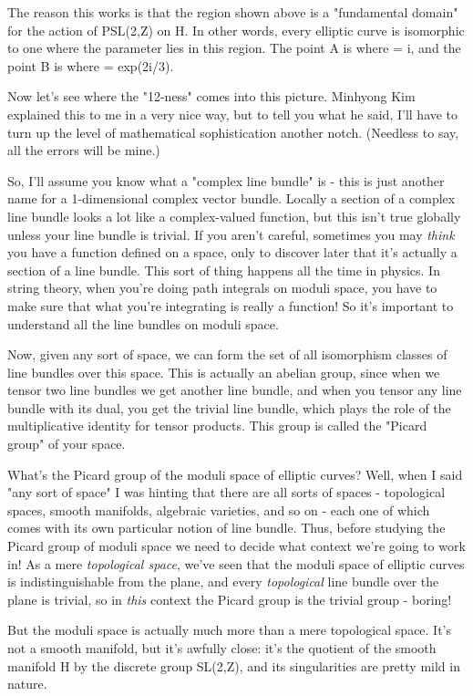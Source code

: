 The reason this works is that the region shown above is a "fundamental
domain" for the action of PSL(2,Z) on H.  In other words, every
elliptic curve is isomorphic to one where the parameter \tau  lies in
this region.  The point A is where \tau  = i, and the point B is where
\tau  = exp(2\pi i/3).

Now let's see where the "12-ness" comes into this picture.  Minhyong
Kim explained this to me in a very nice way, but to tell you what he
said, I'll have to turn up the level of mathematical sophistication
another notch.  (Needless to say, all the errors will be mine.)

So, I'll assume you know what a "complex line bundle" is - this is
just another name for a 1-dimensional complex vector bundle.  Locally
a section of a complex line bundle looks a lot like a complex-valued
function, but this isn't true globally unless your line bundle is
trivial.  If you aren't careful, sometimes you may \emph{think} you have a
function defined on a space, only to discover later that it's actually
a section of a line bundle.  This sort of thing happens all the time
in physics.  In string theory, when you're doing path integrals on
moduli space, you have to make sure that what you're integrating is
really a function!  So it's important to understand all the line bundles
on moduli space.

Now, given any sort of space, we can form the set of all isomorphism
classes of line bundles over this space.  This is actually an abelian
group, since when we tensor two line bundles we get another line
bundle, and when you tensor any line bundle with its dual, you get the
trivial line bundle, which plays the role of the multiplicative
identity for tensor products.  This group is called the "Picard 
group" of your space.

What's the Picard group of the moduli space of elliptic curves?  Well,
when I said "any sort of space" I was hinting that there are all sorts
of spaces - topological spaces, smooth manifolds, algebraic varieties,
and so on - each one of which comes with its own particular notion of
line bundle.  Thus, before studying the Picard group of moduli space
we need to decide what context we're going to work in!  As a mere
\emph{topological space}, we've seen that the moduli space of elliptic
curves is indistinguishable from the plane, and every \emph{topological}
line bundle over the plane is trivial, so in \emph{this} context the Picard
group is the trivial group - boring!

But the moduli space is actually much more than a mere topological
space.  It's not a smooth manifold, but it's awfully close: it's the
quotient of the smooth manifold H by the discrete group SL(2,Z), and
its singularities are pretty mild in nature.  

